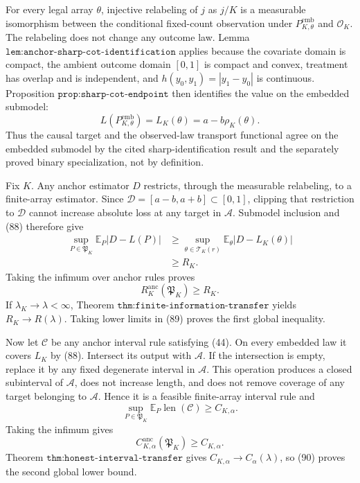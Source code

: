 For every legal array \(\theta\), injective relabeling of \(j\) as
\(j/K\) is a measurable isomorphism between the conditional
fixed-count observation under \(P_{K,\theta}^{\mathrm{emb}}\) and
\(\mathcal O_K\).  The relabeling does not change any outcome law.
Lemma \(\texttt{lem:anchor-sharp-cot-identification}\) applies because
the covariate domain is compact, the ambient outcome domain \([0,1]\)
is compact and convex, treatment has overlap and is independent, and
\(h(y_0,y_1)=|y_1-y_0|\) is continuous.  Proposition
\(\texttt{prop:sharp-cot-endpoint}\) then identifies the value on the
embedded submodel:
\[
 L(P_{K,\theta}^{\mathrm{emb}})
 =L_K(\theta)=a-b\rho_K(\theta).
 \tag{88}
\]
Thus the causal target and the observed-law transport functional agree
on the embedded submodel by the cited sharp-identification result and
the separately proved binary specialization, not by definition.

Fix \(K\).  Any anchor estimator \(D\) restricts, through the measurable
relabeling, to a finite-array estimator.  Since
\(\mathcal D=[a-b,a+b]\subset[0,1]\), clipping that restriction to
\(\mathcal D\) cannot increase absolute loss at any target in
\(\mathcal A\).  Submodel inclusion and (88) therefore give
\[
\begin{aligned}
 \sup_{P\in\mathfrak P_K}\mathbb E_P|D-L(P)|
 &\ge
 \sup_{\theta\in\mathcal T_K(r)}
 \mathbb E_\theta|D-L_K(\theta)|\\
 &\ge R_K.
\end{aligned}
\]
Taking the infimum over anchor rules proves
\[
 R_K^{\mathrm{anc}}(\mathfrak P_K)\ge R_K.
 \tag{89}
\]
If \(\lambda_K\to\lambda<\infty\), Theorem
\(\texttt{thm:finite-information-transfer}\) yields
\(R_K\to R(\lambda)\).  Taking lower limits in (89) proves the first
global inequality.

Now let \(\mathcal C\) be any anchor interval rule satisfying (44).
On every embedded law it covers \(L_K\) by (88).  Intersect its output
with \(\mathcal A\).  If the intersection is empty, replace it by any
fixed degenerate interval in \(\mathcal A\).  This operation produces a
closed subinterval of \(\mathcal A\), does not increase length, and
does not remove coverage of any target belonging to \(\mathcal A\).
Hence it is a feasible finite-array interval rule and
\[
 \sup_{P\in\mathfrak P_K}
 \mathbb E_P\operatorname{len}(\mathcal C)
 \ge C_{K,\alpha}.
\]
Taking the infimum gives
\[
 C_{K,\alpha}^{\mathrm{anc}}(\mathfrak P_K)
 \ge C_{K,\alpha}.
 \tag{90}
\]
Theorem \(\texttt{thm:honest-interval-transfer}\) gives
\(C_{K,\alpha}\to C_\alpha(\lambda)\), so (90) proves the second global
lower bound.

